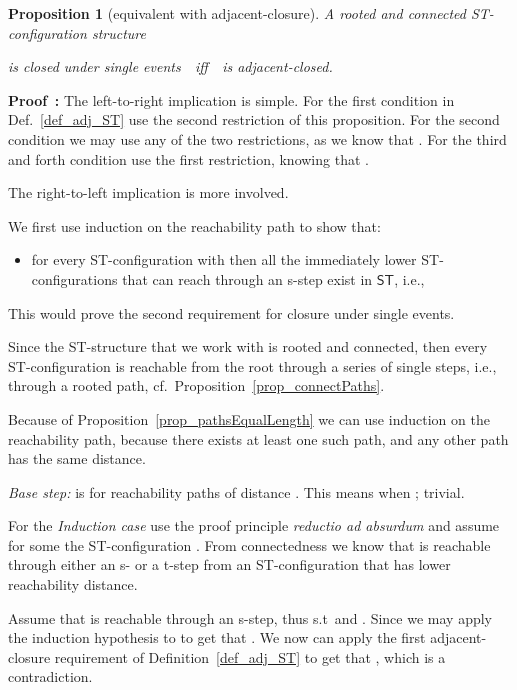 \documentclass[submission,copyright,creativecommons]{eptcs}
\newtheorem{proposition}[theorem]{Proposition}
\newenvironment{proof}[1][\!\!\,]{\vspace{1ex}\noindent\textbf{Proof #1: }}{\hfill\vspace{2ex}}
\newcounter{case}
\newcommand\ST{\ensuremath{\mathsf{ST}}}
\newcommand\ststruct{\ensuremath{\ST}}
\begin{document}
\begin{proposition}[equivalent with adjacent-closure]\label{prop_adj_equiv}
A rooted and connected ST-con\-figuration structure 


\centerline{is closed under single events\ \ iff\ \ is adjacent-closed.}
\end{proposition}

\begin{proof}
The left-to-right implication is simple. For the first condition in Def.~\ref{def_adj_ST} use the second restriction of this proposition. For the second condition we may use any of the two restrictions, as we know that .  For the third and forth condition use the first restriction, knowing that .

The right-to-left implication is more involved.

We first use induction on the reachability path to show that: 
\begin{itemize}
\item[] for every ST-configuration  with  then all the immediately lower ST-configurations that can reach  through an s-step exist in \ststruct, i.e., 

\end{itemize}
This would prove the second requirement for closure under single events.

Since the ST-structure that we work with is rooted and connected, then every ST-configuration is reachable from the root  through a series of single steps, i.e., through a rooted path, cf.\ Proposition~\ref{prop_connectPaths}. 


Because of Proposition~\ref{prop_pathsEqualLength} we can use induction on the reachability path, because there exists at least one such path, and any other path has the same distance.

\textit{Base step:} is for reachability paths of distance . This means when ; trivial.

For the \textit{Induction case} use the proof principle \textit{reductio ad absurdum} and assume for some  the ST-configuration . From connectedness we know that   is reachable through either an s- or a t-step from an ST-configuration that has lower reachability distance.

Assume that  is reachable through an s-step, thus  s.t\  and . Since  we may apply the induction hypothesis to  to get that . We now can apply the first adjacent-closure requirement of Definition~\ref{def_adj_ST} to get that , which is a contradiction.


\end{proof}
\end{document}
